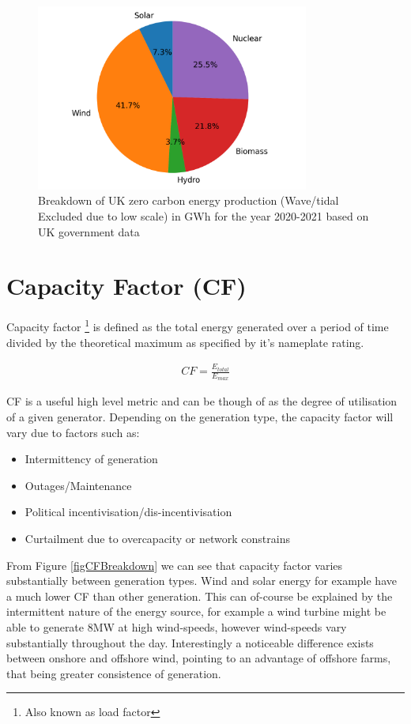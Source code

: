 \documentclass[11pt]{article}
\numberwithin{equation}{section}
\begin{document}
\begin{figure}[H]
\centering
\includegraphics[width=0.8\textwidth]{./.ob-jupyter/9d5f54f66e0860cfcadd03202a7835f8eee375c2.png}
\caption{\label{figPie2020CumGen}Breakdown of UK zero carbon energy production (Wave/tidal Excluded due to low scale) in GWh for the year 2020-2021 based on UK government data \cite{RenewableElecricityCap}}
\end{figure}

\section{Capacity Factor (CF) \label{secCF}}
\label{sec:org8f183da}
Capacity factor \footnote{Also known as load factor} is defined as the total energy generated over a period of time divided by the theoretical maximum as specified by it's nameplate rating.

\begin{align}
\label{eqCFDeff}
CF= \frac{E_{total}}{E_{max}}
\end{align}

CF is a useful high level metric and can be though of as the degree of utilisation of a given generator. Depending on the generation type, the capacity factor will vary due to factors such as:
\begin{itemize}
\item Intermittency of generation
\item Outages/Maintenance
\item Political incentivisation/dis-incentivisation
\item Curtailment due to overcapacity or network constrains
\end{itemize}

From Figure \ref{figCFBreakdown} we can see that capacity factor varies substantially between generation types. Wind and solar energy for example have a much lower CF than other generation. This can of-course be explained by the intermittent nature of the energy source, for example a wind turbine might be able to generate 8MW at high wind-speeds, however wind-speeds vary substantially throughout the day. Interestingly a noticeable difference exists between onshore and offshore wind, pointing to an advantage of offshore farms, that being greater consistence of generation.
\end{document}
